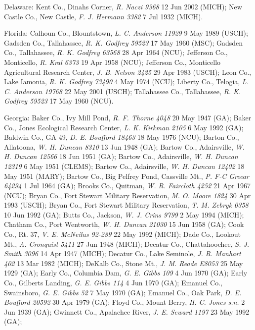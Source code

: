 \documentclass{article}
\begin{document}
Delaware:
Kent Co., Dinahs Corner, \textit{R. Naczi 9368} 12 Jun 2002 (MICH);
New Castle Co., New Castle, \textit{F. J. Hermann 3382} 7 Jul 1932 (MICH).

Florida:
Calhoun Co., Blountstown, \textit{L. C. Anderson 11929} 9 May 1989 (USCH);
Gadsden Co., Tallahassee, \textit{R. K. Godfrey 59523} 17 May 1960 (MSC);
Gadsden Co., Tallahassee, \textit{R. K. Godfrey 63568} 28 Apr 1964 (NCU);
Jefferson Co., Monticello, \textit{R. Kral 6373} 19 Apr 1958 (NCU);
Jefferson Co., Monticello Agricultural Research Center, \textit{J. B. Nelson 2425} 29 Apr 1983 (USCH);
Leon Co., Lake Iamonia, \textit{R. K. Godfrey 73490} 4 May 1974 (NCU);
Liberty Co., Telogia, \textit{L. C. Anderson 19768} 22 May 2001 (USCH);
Tallahassee Co., Tallahassee, \textit{R. K. Godfrey 59523} 17 May 1960 (NCU).

Georgia:
Baker Co., Ivy Mill Pond, \textit{R. F. Thorne 4048} 20 May 1947 (GA);
Baker Co., Jones Ecological Research Center, \textit{L. K. Kirkman 2105} 6 May 1992 (GA);
Baldwin Co., GA 49, \textit{D. E. Boufford 18463} 18 May 1976 (NCU);
Barton Co., Allatoona, \textit{W. H. Duncan 8310} 13 Jun 1948 (GA);
Bartow Co., Adairsville, \textit{W. H. Duncan 12566} 18 Jun 1951 (GA);
Bartow Co., Adairsville, \textit{W. H. Duncan 12319} 6 May 1951 (CLEMS);
Bartow Co., Adairsville, \textit{W. H. Duncan 12402} 18 May 1951 (MARY);
Bartow Co., Big Pelfrey Pond, Cassville Mt., \textit{P. F-C Greear 64294} 1 Jul 1964 (GA);
Brooks Co., Quitman, \textit{W. R. Faircloth 4252} 21 Apr 1967 (NCU);
Bryan Co., Fort Stewart Military Reservation, \textit{M. O. Moore 1824} 30 Apr 1993 (USCH);
Bryan Co., Fort Stewart Military Reservation, \textit{T. M. Zebryk 0358} 10 Jun 1992 (GA);
Butts Co., Jackson, \textit{W. J. Crins 9799} 2 May 1994 (MICH);
Chatham Co., Port Wentworth, \textit{W. H. Duncan 21030} 15 Jun 1958 (GA);
Cook Co., Rt. 37, \textit{V. E. McNeilus 92-289} 22 May 1992 (MICH);
Dade Co., Lookout Mt., \textit{A. Cronquist 5411} 27 Jun 1948 (MICH);
Decatur Co., Chattahoochee, \textit{S. J. Smith 3096} 14 Apr 1947 (MICH);
Decatur Co., Lake Seminole, \textit{J. R. Manhart 402} 13 Mar 1982 (MICH);
DeKalb Co., Stone Mt., \textit{J. M. Reade E8053} 25 May 1929 (GA);
Early Co., Columbia Dam, \textit{G. E. Gibbs 109} 4 Jun 1970 (GA);
Early Co., Gilberts Landing, \textit{G. E. Gibbs 114} 4 Jun 1970 (GA);
Emanuel Co., Swainsboro, \textit{G. E. Gibbs 52} 7 May 1970 (GA);
Emanuel Co., Oak Park, \textit{D. E. Boufford 20592} 30 Apr 1979 (GA);
Floyd Co., Mount Berry, \textit{H. C. Jones s.n.} 2 Jun 1939 (GA);
Gwinnett Co., Apalachee River, \textit{J. E. Seward 1197} 23 May 1992 (GA);
\end{document}
